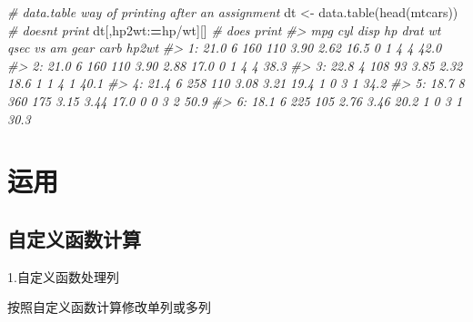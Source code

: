 \documentclass[
]{book}
\newenvironment{Shaded}{\begin{snugshade}}{\end{snugshade}}
\newcommand{\CommentTok}[1]{\textcolor[rgb]{0.56,0.35,0.01}{\textit{#1}}}
\newcommand{\ErrorTok}[1]{\textcolor[rgb]{0.64,0.00,0.00}{\textbf{#1}}}
\newcommand{\FunctionTok}[1]{\textcolor[rgb]{0.00,0.00,0.00}{#1}}
\newcommand{\NormalTok}[1]{#1}
\newcommand{\OtherTok}[1]{\textcolor[rgb]{0.56,0.35,0.01}{#1}}
\newcommand{\SpecialCharTok}[1]{\textcolor[rgb]{0.00,0.00,0.00}{#1}}
\begin{document}
\begin{Shaded}
\begin{Highlighting}[]
\CommentTok{\# data.table way of printing after an assignment}
\NormalTok{dt }\OtherTok{\textless{}{-}} \FunctionTok{data.table}\NormalTok{(}\FunctionTok{head}\NormalTok{(mtcars)) }\CommentTok{\# doesn\textquotesingle{}t print}
\NormalTok{dt[,hp2wt}\SpecialCharTok{:}\ErrorTok{=}\NormalTok{hp}\SpecialCharTok{/}\NormalTok{wt][] }\CommentTok{\# does print}
\CommentTok{\#\textgreater{}     mpg cyl disp  hp drat   wt qsec vs am gear carb hp2wt}
\CommentTok{\#\textgreater{} 1: 21.0   6  160 110 3.90 2.62 16.5  0  1    4    4  42.0}
\CommentTok{\#\textgreater{} 2: 21.0   6  160 110 3.90 2.88 17.0  0  1    4    4  38.3}
\CommentTok{\#\textgreater{} 3: 22.8   4  108  93 3.85 2.32 18.6  1  1    4    1  40.1}
\CommentTok{\#\textgreater{} 4: 21.4   6  258 110 3.08 3.21 19.4  1  0    3    1  34.2}
\CommentTok{\#\textgreater{} 5: 18.7   8  360 175 3.15 3.44 17.0  0  0    3    2  50.9}
\CommentTok{\#\textgreater{} 6: 18.1   6  225 105 2.76 3.46 20.2  1  0    3    1  30.3}
\end{Highlighting}
\end{Shaded}

\hypertarget{ux8fd0ux7528}{%
\section{运用}\label{ux8fd0ux7528}}

\hypertarget{ux81eaux5b9aux4e49ux51fdux6570ux8ba1ux7b97}{%
\subsection{自定义函数计算}\label{ux81eaux5b9aux4e49ux51fdux6570ux8ba1ux7b97}}

1.自定义函数处理列

按照自定义函数计算修改单列或多列
\end{document}
